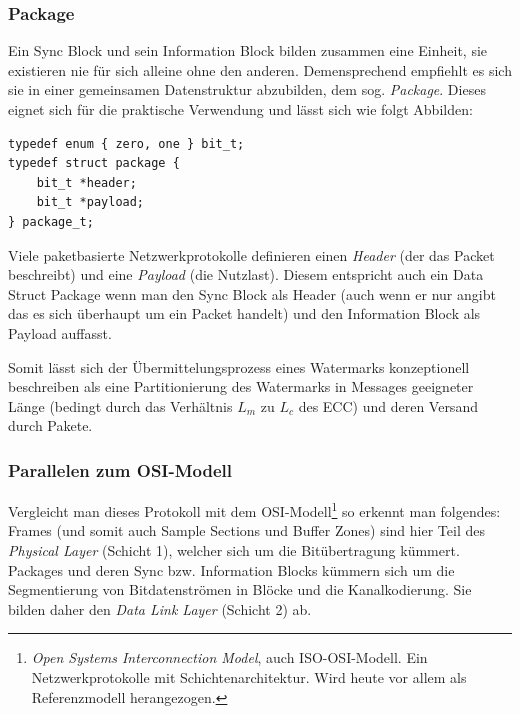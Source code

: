 \subsubsection{Package}

Ein Sync Block und sein Information Block bilden zusammen eine Einheit, sie existieren nie für sich alleine ohne den anderen. Demensprechend empfiehlt es sich sie in einer gemeinsamen Datenstruktur abzubilden, dem sog. \textit{Package}. Dieses eignet sich für die praktische Verwendung und lässt sich wie folgt Abbilden:


\lstset{escapechar=@,style=customc}         
\begin{lstlisting}
typedef enum { zero, one } bit_t;
typedef struct package {
    bit_t *header;
    bit_t *payload; 
} package_t;
\end{lstlisting}

Viele paketbasierte Netzwerkprotokolle definieren einen \textit{Header} (der das Packet beschreibt) und eine \textit{Payload} (die \glqq{}Nutzlast\grqq{}). Diesem entspricht auch ein Data Struct Package wenn man den Sync Block als Header (auch wenn er nur angibt das es sich überhaupt um ein Packet handelt) und den Information Block als Payload auffasst.

Somit lässt sich der Übermittelungsprozess eines Watermarks konzeptionell beschreiben als eine Partitionierung des Watermarks in Messages geeigneter Länge (bedingt durch das Verhältnis $L_m$ zu $L_c$ des ECC) und deren Versand durch Pakete.

\subsubsection{Parallelen zum OSI-Modell}

Vergleicht man dieses Protokoll mit dem OSI-Modell\footnote{\textit{Open Systems Interconnection Model}, auch ISO-OSI-Modell. Ein Netzwerkprotokolle mit Schichtenarchitektur. Wird heute vor allem als Referenzmodell herangezogen.} so erkennt man folgendes: Frames (und somit auch Sample Sections und Buffer Zones) sind hier Teil des \textit{Physical Layer} (Schicht 1), welcher sich um die Bitübertragung kümmert. Packages und deren Sync bzw. Information Blocks kümmern sich um  die Segmentierung von Bitdatenströmen in Blöcke und die Kanalkodierung. Sie bilden daher den \textit{Data Link Layer} (Schicht 2) ab.
 
